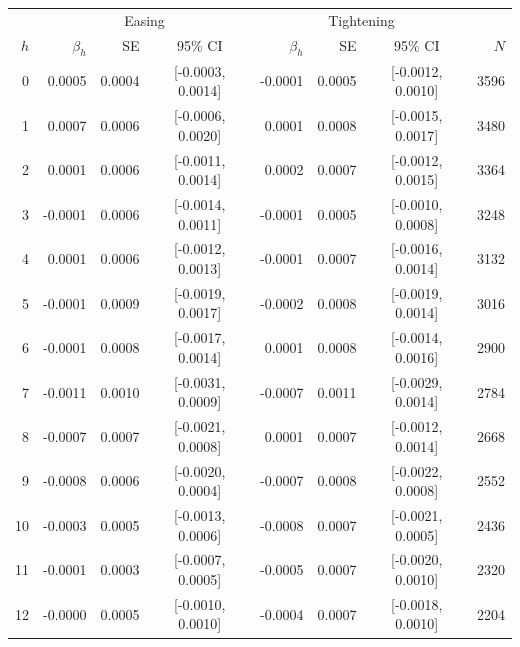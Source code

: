 \begin{tabular}{r r r c r r c r}
\toprule
 & \multicolumn{3}{c}{Easing} & \multicolumn{3}{c}{Tightening} & \\
$h$ & $\beta_h$ & SE & 95\% CI & $\beta_h$ & SE & 95\% CI & $N$ \\
\midrule
0 & 0.0005 & 0.0004 & [-0.0003, 0.0014] & -0.0001 & 0.0005 & [-0.0012, 0.0010] & 3596 \\
1 & 0.0007 & 0.0006 & [-0.0006, 0.0020] & 0.0001 & 0.0008 & [-0.0015, 0.0017] & 3480 \\
2 & 0.0001 & 0.0006 & [-0.0011, 0.0014] & 0.0002 & 0.0007 & [-0.0012, 0.0015] & 3364 \\
3 & -0.0001 & 0.0006 & [-0.0014, 0.0011] & -0.0001 & 0.0005 & [-0.0010, 0.0008] & 3248 \\
4 & 0.0001 & 0.0006 & [-0.0012, 0.0013] & -0.0001 & 0.0007 & [-0.0016, 0.0014] & 3132 \\
5 & -0.0001 & 0.0009 & [-0.0019, 0.0017] & -0.0002 & 0.0008 & [-0.0019, 0.0014] & 3016 \\
6 & -0.0001 & 0.0008 & [-0.0017, 0.0014] & 0.0001 & 0.0008 & [-0.0014, 0.0016] & 2900 \\
7 & -0.0011 & 0.0010 & [-0.0031, 0.0009] & -0.0007 & 0.0011 & [-0.0029, 0.0014] & 2784 \\
8 & -0.0007 & 0.0007 & [-0.0021, 0.0008] & 0.0001 & 0.0007 & [-0.0012, 0.0014] & 2668 \\
9 & -0.0008 & 0.0006 & [-0.0020, 0.0004] & -0.0007 & 0.0008 & [-0.0022, 0.0008] & 2552 \\
10 & -0.0003 & 0.0005 & [-0.0013, 0.0006] & -0.0008 & 0.0007 & [-0.0021, 0.0005] & 2436 \\
11 & -0.0001 & 0.0003 & [-0.0007, 0.0005] & -0.0005 & 0.0007 & [-0.0020, 0.0010] & 2320 \\
12 & -0.0000 & 0.0005 & [-0.0010, 0.0010] & -0.0004 & 0.0007 & [-0.0018, 0.0010] & 2204 \\
\bottomrule
\end{tabular}
